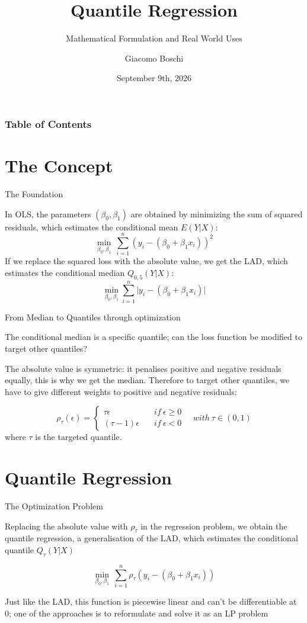 \documentclass{beamer}
\title{Quantile Regression}
\subtitle{Mathematical Formulation and Real World Uses}
\author{Giacomo Boschi}
\date{September 9th, 2026}
\begin{document}
\begin{frame}
	\titlepage
\end{frame}

\begin{frame}
	\frametitle{Table of Contents}
	\tableofcontents
\end{frame}

\section{The Concept}
\begin{frame}{The Foundation}
	\begin{center}
		In OLS, the parameters $(\beta_0,\beta_1)$ are obtained by minimizing the sum of squared residuals, which estimates the conditional mean $E(Y|X)$:
		\[\min_{\beta_0,\beta_1}\ \sum_{i=1}^n(y_i - (\beta_0+\beta_1 x_i))^2\]\hfill \break
		If we replace the squared loss with the absolute value, we get the LAD, which estimates the conditional median $Q_{0,5}(Y|X)$:\hfill \break
		\[\min_{\beta_0,\beta_1} \sum_{i=1}^n\lvert y_i - (\beta_0+\beta_1 x_i)\rvert\]
	\end{center}
\end{frame}

\begin{frame}{From Median to Quantiles through optimization}
	\begin{center}
		The conditional median is a specific quantile; can the loss function be modified to target other quantiles?\hfill \break

		The absolute value is symmetric: it penalises positive and negative residuals equally, this is why we get the median. Therefore to target other quantiles, we have to give different weights to positive and negative residuals:

		\[
			\rho_{\tau}(\epsilon)  = \begin{cases}
				\tau\epsilon\quad     & if\ \epsilon \geq 0 \\
				(\tau-1)\epsilon\quad & if\ \epsilon < 0
			\end{cases}\quad with\ \tau \in (0,1)
		\]
		where $\tau$ is the targeted quantile.
	\end{center}
\end{frame}

\section{Quantile Regression}
\begin{frame}{The Optimization Problem}
	\begin{center}
		Replacing the absolute value with $\rho_\tau$ in the regression problem, we obtain the quantile regression, a generalisation of the LAD, which estimates the conditional quantile $Q_\tau(Y|X)$

		\[
			\min_{\beta_0,\beta_1}\ \sum_{i=1}^n \rho_\tau(y_i-(\beta_0+\beta_1x_i))
		\]

		Just like the LAD, this function is piecewise linear and can't be differentiable at 0; one of the approaches is to reformulate and solve it as an LP problem
	\end{center}
\end{frame}
\end{document}

